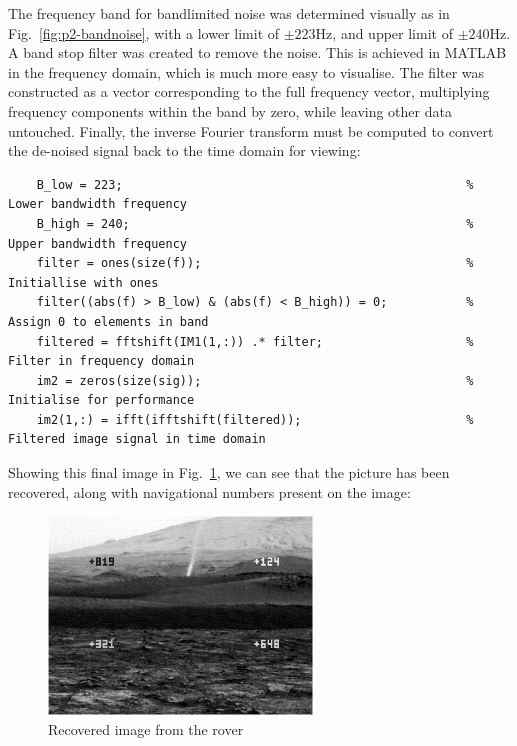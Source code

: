 \documentclass[12pt]{article}
\begin{document}
The frequency band for bandlimited noise was determined visually as in
Fig.~\ref{fig:p2-bandnoise}, with a lower limit of $\pm 223$Hz, and upper limit
of $\pm 240$Hz. A band stop filter was created to remove the noise. This is
achieved in MATLAB in the frequency domain, which is much more easy to
visualise. The filter was constructed as a vector corresponding to the full
frequency vector, multiplying frequency components within the band by zero,
while leaving other data untouched. Finally, the inverse Fourier transform must
be computed to convert the de-noised signal back to the time domain for
viewing:
\begin{verbatim}
    B_low = 223;                                                % Lower bandwidth frequency
    B_high = 240;                                               % Upper bandwidth frequency
    filter = ones(size(f));                                     % Initiallise with ones
    filter((abs(f) > B_low) & (abs(f) < B_high)) = 0;           % Assign 0 to elements in band
    filtered = fftshift(IM1(1,:)) .* filter;                    % Filter in frequency domain
    im2 = zeros(size(sig));                                     % Initialise for performance
    im2(1,:) = ifft(ifftshift(filtered));                       % Filtered image signal in time domain
\end{verbatim}

Showing this final image in Fig.~\ref{fig:p2-im1recov}, we can see that the
picture has been recovered, along with navigational numbers present on the
image:

\begin{figure}[ht]
    \centering
    \includegraphics[width=7cm]{figures/p2-im1recov.png}
    \caption{Recovered image from the rover\label{fig:p2-im1recov}}
\end{figure}
\end{document}
